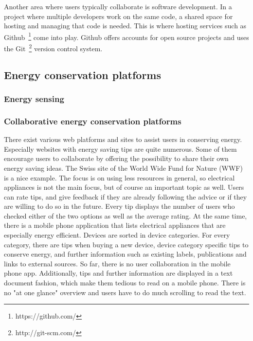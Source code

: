 Another area where users typically collaborate is software development. In a project where multiple developers work on the same code, a shared space for hosting and managing that code is needed. This is where hosting services such as Github~\footnote{https://github.com/} come into play. Github offers accounts for open source projects and uses the Git~\footnote{http://git-scm.com/} version control system.  

\subsection{Energy conservation platforms}
\subsubsection{Energy sensing}
\subsubsection{Collaborative energy conservation platforms}
There exist various web platforms and sites to assist users in conserving energy. Especially websites with energy saving tips are quite numerous. Some of them encourage users to collaborate by offering the possibility to share their own energy saving ideas. The Swiss site of the World Wide Fund for Nature (WWF)~\cite{wwf} is a nice example. The focus is on using less resources in general, so electrical appliances is not the main focus, but of course an important topic as well. Users can rate tips, and give feedback if they are already following the advice or if they are willing to do so in the future. Every tip displays the number of users who checked either of the two options as well as the average rating. At the same time, there is a mobile phone application that lists electrical appliances that are especially energy efficient. Devices are sorted in device categories. For every category, there are tips when buying a new device, device category specific tips to conserve energy, and further information such as existing labels, publications and links to external sources. So far, there is no user collaboration in the mobile phone app. Additionally, tips and further information are displayed in a text document fashion, which make them tedious to read on a mobile phone. There is no "at one glance" overview and users have to do much scrolling to read the text.   

